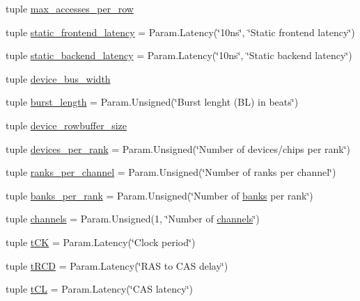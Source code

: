 \begin{DoxyCompactItemize}
\item 
tuple \hyperlink{classDRAMCtrl_1_1DRAMCtrl_a2c202719d898485a257f5e005b9d2706}{max\_\-accesses\_\-per\_\-row}
\item 
tuple \hyperlink{classDRAMCtrl_1_1DRAMCtrl_a37607d1e67471a6c3fdd8746152f911a}{static\_\-frontend\_\-latency} = Param.Latency(\char`\"{}10ns\char`\"{}, \char`\"{}Static frontend latency\char`\"{})
\item 
tuple \hyperlink{classDRAMCtrl_1_1DRAMCtrl_a595c9b794d86d2ca9ca2bc28a8be9adf}{static\_\-backend\_\-latency} = Param.Latency(\char`\"{}10ns\char`\"{}, \char`\"{}Static backend latency\char`\"{})
\item 
tuple \hyperlink{classDRAMCtrl_1_1DRAMCtrl_a07485b73205fce4f544f48a9debd611f}{device\_\-bus\_\-width}
\item 
tuple \hyperlink{classDRAMCtrl_1_1DRAMCtrl_a515af56f26521d738587f488ea98a63b}{burst\_\-length} = Param.Unsigned(\char`\"{}Burst lenght (BL) in beats\char`\"{})
\item 
tuple \hyperlink{classDRAMCtrl_1_1DRAMCtrl_acb160e4605e4602317ce572b167a777c}{device\_\-rowbuffer\_\-size}
\item 
tuple \hyperlink{classDRAMCtrl_1_1DRAMCtrl_aca94f785cead0d3d819f1a1f2d2f5aa9}{devices\_\-per\_\-rank} = Param.Unsigned(\char`\"{}Number of devices/chips per rank\char`\"{})
\item 
tuple \hyperlink{classDRAMCtrl_1_1DRAMCtrl_aa95cbd3a64893b94d352bece9d0c9794}{ranks\_\-per\_\-channel} = Param.Unsigned(\char`\"{}Number of ranks per channel\char`\"{})
\item 
tuple \hyperlink{classDRAMCtrl_1_1DRAMCtrl_a594ca2e17132484351baf7e79ecb5868}{banks\_\-per\_\-rank} = Param.Unsigned(\char`\"{}Number of \hyperlink{classDRAMCtrl_ac4dd7a78e52bcaca6fb18d24b45bb7f3}{banks} per rank\char`\"{})
\item 
tuple \hyperlink{classDRAMCtrl_1_1DRAMCtrl_af713f23641a8e59f46aeedcb92721b7f}{channels} = Param.Unsigned(1, \char`\"{}Number of \hyperlink{classDRAMCtrl_1_1DRAMCtrl_af713f23641a8e59f46aeedcb92721b7f}{channels}\char`\"{})
\item 
tuple \hyperlink{classDRAMCtrl_1_1DRAMCtrl_a028d6bb21e2386ba31699d3c56396a6f}{tCK} = Param.Latency(\char`\"{}Clock period\char`\"{})
\item 
tuple \hyperlink{classDRAMCtrl_1_1DRAMCtrl_ac5b640410cc96d56859a99453a4d4edf}{tRCD} = Param.Latency(\char`\"{}RAS to CAS delay\char`\"{})
\item 
tuple \hyperlink{classDRAMCtrl_1_1DRAMCtrl_a9bec1443ae22542fb65468589d8ef845}{tCL} = Param.Latency(\char`\"{}CAS latency\char`\"{})

\end{DoxyCompactItemize}
